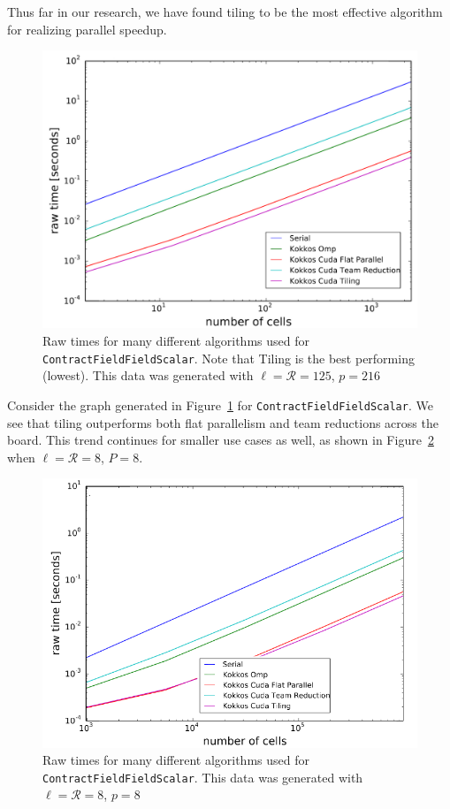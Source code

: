 Thus far in our research, we have found tiling to be the most effective
algorithm for realizing parallel speedup. 

\begin{figure}[H]
    \centering
\includegraphics[scale = 1]{CFFS_RawTimes_LR125P216_2.PNG} 
\caption[\texttt{ContractFieldFieldScalar} performance summary (large)]{Raw times
    for many different algorithms used for \texttt{ContractFieldFieldScalar}.
    Note that Tiling is the best performing (lowest). This data was generated
    with
    $\ell=\mathcal{R}=125$, $p=216$}
\label{fig:TilingPerformance}
\end{figure}
Consider the graph generated in Figure~\ref{fig:TilingPerformance} for \texttt{ContractFieldFieldScalar}. We see that tiling outperforms both flat parallelism and team reductions across the board. This trend continues for smaller use cases as well, as shown in Figure~\ref{fig:TilingPerformance2} when $\ell = \mathcal{R} = 8$, $P = 8$.

\begin{figure}[H]
    \centering
    \includegraphics[scale = 1]{CFFS_RawTimes_LRP8_2.PNG}
    \caption[\texttt{ContractFieldFieldScalar} performance summary (small)]{Raw
        times for many different algorithms used for \texttt{ContractFieldFieldScalar}.
        This data was generated with $\ell=\mathcal{R}=8$, $p=8$}
\label{fig:TilingPerformance2}
\end{figure}

